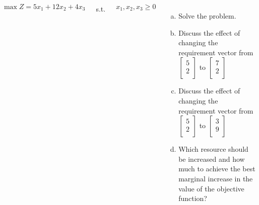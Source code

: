 \begin{frameExample}{}{}

  \begin{columns}
      $\max Z = 5x_1 + 12x_2 + 4x_3$

      \vspace{5mm}

      s.t.

  \vspace{5mm}
  
  $x_1 , x_2, x_3 \geq 0$ 
  \begin{enumerate}[a)] \justifying \parskip4mm
  \item Solve the problem.
  \item Discuss the effect of changing the requirement vector from $%
    \begin{bmatrix}
      5\\
      2\\
    \end{bmatrix}
    $%
    to%
    $
    \begin{bmatrix}
      7\\
      2\\
    \end{bmatrix}
$
\item Discuss the effect of changing the requirement vector from %
  $
  \begin{bmatrix}
    5\\2\\
  \end{bmatrix}
  $
  to%
  $
  \begin{bmatrix}
    3\\9\\
  \end{bmatrix}
  $
  \item Which resource should be increased and how much to achieve the best marginal increase in the value of the objective function?
  \end{enumerate}
  \end{columns}
\end{frameExample}


